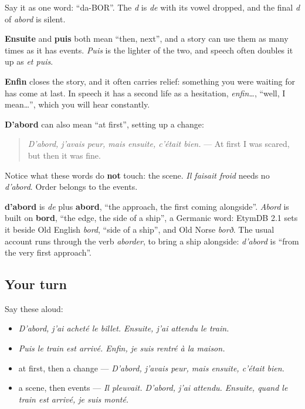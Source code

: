Say it as one word: \textquotedblleft{}da-BOR\textquotedblright{}. The \emph{d} is \emph{de} with its vowel dropped, and the final \emph{d} of \emph{abord} is silent.

\begin{grammarlens}[title={Grammar Lens: four places in a story}]
\textbf{Ensuite} and \textbf{puis} both mean \textquotedblleft{}then, next\textquotedblright{}, and a story can use them as many times as it has events. \emph{Puis} is the lighter of the two, and speech often doubles it up as \emph{et puis}.

\textbf{Enfin} closes the story, and it often carries relief: something you were waiting for has come at last. In speech it has a second life as a hesitation, \emph{enfin…}, \textquotedblleft{}well, I mean…\textquotedblright{}, which you will hear constantly.

\textbf{D'abord} can also mean \textquotedblleft{}at first\textquotedblright{}, setting up a change:

\begin{quote}
\emph{D'abord, j'avais peur, mais ensuite, c'était bien.} — At first I was scared, but then it was fine.
\end{quote}

Notice what these words do \textbf{not} touch: the scene. \emph{Il faisait froid} needs no \emph{d'abord}. Order belongs to the events.
\end{grammarlens}

\begin{cousinweb}
\textbf{d'abord} is \emph{de} plus \textbf{abord}, \textquotedblleft{}the approach, the first coming alongside\textquotedblright{}. \emph{Abord} is built on \textbf{bord}, \textquotedblleft{}the edge, the side of a ship\textquotedblright{}, a Germanic word: EtymDB 2.1 sets it beside Old English \emph{bord}, \textquotedblleft{}side of a ship\textquotedblright{}, and Old Norse \emph{borð}. The usual account runs through the verb \emph{aborder}, to bring a ship alongside: \emph{d'abord} is \textquotedblleft{}from the very first approach\textquotedblright{}.
\end{cousinweb}

\subsection*{Your turn}
Say these aloud:

\begin{itemize}
\raggedright
  \item \emph{D'abord, j'ai acheté le billet. Ensuite, j'ai attendu le train.}
  \item \emph{Puis le train est arrivé. Enfin, je suis rentré à la maison.}
  \item at first, then a change — \emph{D'abord, j'avais peur, mais ensuite, c'était bien.}
  \item a scene, then events — \emph{Il pleuvait. D'abord, j'ai attendu. Ensuite, quand le train est arrivé, je suis monté.}
\end{itemize}


